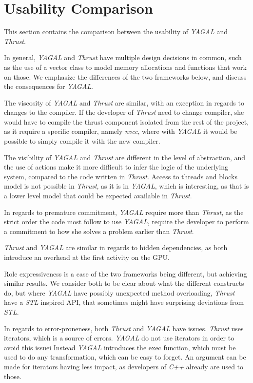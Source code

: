 \section{Usability Comparison} \label{sec:comparisoncomparison}
This section contains the comparison between the usability of \textit{YAGAL} and \textit{Thrust}. 

In general, \textit{YAGAL} and \textit{Thrust} have multiple design decisions in common, such as the use of a vector class to model memory allocations and functions that work on those. We emphasize the differences of the two frameworks below, and discuss the consequences for \textit{YAGAL}.

The viscosity of \textit{YAGAL} and \textit{Thrust} are similar, with an exception in regards to changes to the compiler. If the developer of \textit{Thrust} need to change compiler, she would have to compile the thrust component isolated from the rest of the project, as it require a specific compiler, namely \textit{nvcc}, where with \textit{YAGAL} it would be possible to simply compile it with the new compiler.

The visibility of \textit{YAGAL} and \textit{Thrust} are different in the level of abstraction, and the use of actions make it more difficult to infer the logic of the underlying system, compared to the code written in \textit{Thrust}. Access to threads and blocks model is not possible in \textit{Thrust}, as it is in \textit{YAGAL}, which is interesting, as that is a lower level model that could be expected available in \textit{Thrust}.

In regards to premature commitment, \textit{YAGAL} require more than \textit{Thrust}, as the strict order the code most follow to use \textit{YAGAL}, require the developer to perform a commitment to how she solves a problem earlier than \textit{Thrust}.

\textit{Thrust} and \textit{YAGAL} are similar in regards to hidden dependencies, as both introduce an overhead at the first activity on the GPU.

Role expressiveness is a case of the two frameworks being different, but achieving similar results. We consider both to be clear about what the different constructs do, but where \textit{YAGAL} have possibly unexpected method overloading, \textit{Thrust} have a \textit{STL} inspired API, that sometimes might have surprising deviations from \textit{STL}.

In regards to error-proneness, both \textit{Thrust} and \textit{YAGAL} have issues. \textit{Thrust} uses iterators, which is a source of errors. \textit{YAGAL} do not use iterators in order to avoid this issuei Instead \textit{YAGAL} introduces the exec function, which must be used to do any transformation, which can be easy to forget. An argument can be made for iterators having less impact, as developers of \textit{C++} already are used to those.

